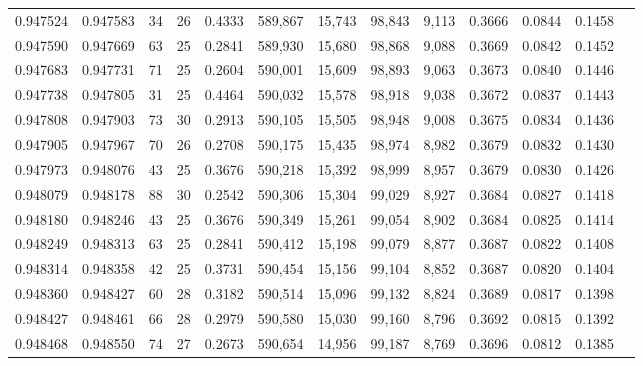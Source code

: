 \begin{tabular}{rrrrrrrrrrrrr}
0.947524 & 0.947583 &    34 &  26 &                                     0.4333 & 589,867 &  15,743 &  98,843 &   9,113 & 0.3666 & 0.0844 & 0.1458 \\
0.947590 & 0.947669 &    63 &  25 &                                     0.2841 & 589,930 &  15,680 &  98,868 &   9,088 & 0.3669 & 0.0842 & 0.1452 \\
0.947683 & 0.947731 &    71 &  25 &                                     0.2604 & 590,001 &  15,609 &  98,893 &   9,063 & 0.3673 & 0.0840 & 0.1446 \\
0.947738 & 0.947805 &    31 &  25 &                                     0.4464 & 590,032 &  15,578 &  98,918 &   9,038 & 0.3672 & 0.0837 & 0.1443 \\
0.947808 & 0.947903 &    73 &  30 &                                     0.2913 & 590,105 &  15,505 &  98,948 &   9,008 & 0.3675 & 0.0834 & 0.1436 \\
0.947905 & 0.947967 &    70 &  26 &                                     0.2708 & 590,175 &  15,435 &  98,974 &   8,982 & 0.3679 & 0.0832 & 0.1430 \\
0.947973 & 0.948076 &    43 &  25 &                                     0.3676 & 590,218 &  15,392 &  98,999 &   8,957 & 0.3679 & 0.0830 & 0.1426 \\
0.948079 & 0.948178 &    88 &  30 &                                     0.2542 & 590,306 &  15,304 &  99,029 &   8,927 & 0.3684 & 0.0827 & 0.1418 \\
0.948180 & 0.948246 &    43 &  25 &                                     0.3676 & 590,349 &  15,261 &  99,054 &   8,902 & 0.3684 & 0.0825 & 0.1414 \\
0.948249 & 0.948313 &    63 &  25 &                                     0.2841 & 590,412 &  15,198 &  99,079 &   8,877 & 0.3687 & 0.0822 & 0.1408 \\
0.948314 & 0.948358 &    42 &  25 &                                     0.3731 & 590,454 &  15,156 &  99,104 &   8,852 & 0.3687 & 0.0820 & 0.1404 \\
0.948360 & 0.948427 &    60 &  28 &                                     0.3182 & 590,514 &  15,096 &  99,132 &   8,824 & 0.3689 & 0.0817 & 0.1398 \\
0.948427 & 0.948461 &    66 &  28 &                                     0.2979 & 590,580 &  15,030 &  99,160 &   8,796 & 0.3692 & 0.0815 & 0.1392 \\
0.948468 & 0.948550 &    74 &  27 &                                     0.2673 & 590,654 &  14,956 &  99,187 &   8,769 & 0.3696 & 0.0812 & 0.1385 \\

\end{tabular}
